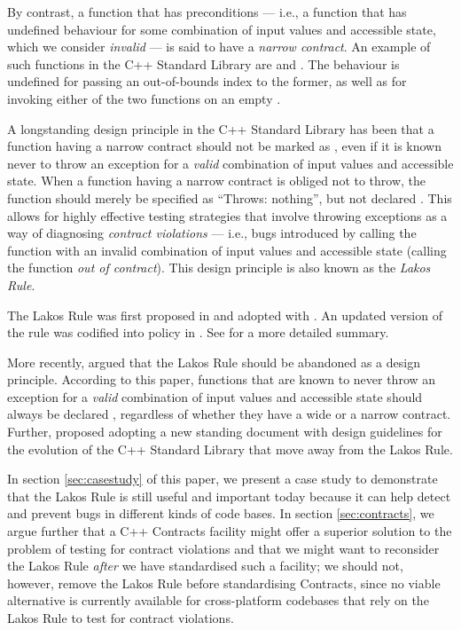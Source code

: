By contrast, a function that has preconditions --- i.e., a function that has undefined behaviour for some combination of input values and accessible state, which we consider \emph{invalid} --- is said to have a \emph{narrow contract}. An example of such functions in the C++ Standard Library are  and . The behaviour is undefined for passing an out-of-bounds index to the former, as well as for invoking either of the two functions on an empty .

A longstanding design principle in the C++ Standard Library has been that a function having a narrow contract should not be marked as , even if it is known never to throw an exception for a \emph{valid} combination of input values and accessible state. When a function having a narrow contract is obliged not to throw, the function should merely be specified as ``Throws: nothing'', but not declared . This allows for highly effective testing strategies that involve throwing exceptions as a way of diagnosing \emph{contract violations} --- i.e., bugs introduced by calling the function with an invalid combination of input values and accessible state (calling the function \emph{out of contract}). This design principle is also known as the \emph{Lakos Rule}.

The Lakos Rule was first proposed in \cite{N3248} and adopted with \cite{N3279}. An updated version of the rule was codified into policy in \cite{P0884R0}. See \cite{O'Dwyer2018} for a more detailed summary.

More recently, \cite{P1656R2} argued that the Lakos Rule should be abandoned as a design principle. According to this paper, functions that are known to never throw an exception for a \emph{valid} combination of input values and accessible state should always be declared , regardless of whether they have a wide or a narrow contract. Further, \cite{P2148R0} proposed adopting a new standing document with design guidelines for the evolution of the C++ Standard Library that move away from the Lakos Rule.

In section \ref{sec:casestudy} of this paper, we present a case study to demonstrate that the Lakos Rule is still useful and important today because it can help detect and prevent bugs in different kinds of code bases. In section \ref{sec:contracts}, we argue further that a C++ Contracts facility might offer a superior solution to the problem of testing for contract violations and that we might want to reconsider the Lakos Rule \emph{after} we have standardised such a facility; we should not, however, remove the Lakos Rule before standardising Contracts, since no viable alternative is currently available for cross-platform codebases that rely on the Lakos Rule to test for contract violations.

